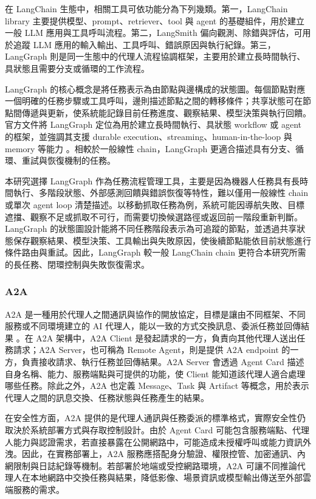 \documentclass[12pt,a4paper]{article}
\begin{document}
在 LangChain 生態中，相關工具可依功能分為下列幾類。第一，LangChain library 主要提供模型、prompt、retriever、tool 與 agent 的基礎組件，用於建立一般 LLM 應用與工具呼叫流程。第二，LangSmith 偏向觀測、除錯與評估，可用於追蹤 LLM 應用的輸入輸出、工具呼叫、錯誤原因與執行紀錄。第三，LangGraph 則是同一生態中的代理人流程協調框架，主要用於建立長時間執行、具狀態且需要分支或循環的工作流程。

LangGraph 的核心概念是將任務表示為由節點與邊構成的狀態圖。每個節點對應一個明確的任務步驟或工具呼叫，邊則描述節點之間的轉移條件；共享狀態可在節點間傳遞與更新，使系統能記錄目前任務進度、觀察結果、模型決策與執行回饋。官方文件將 LangGraph 定位為用於建立長時間執行、具狀態 workflow 或 agent 的框架，並強調其支援 durable execution、streaming、human-in-the-loop 與 memory 等能力 \cite{langgraph_workflows}。相較於一般線性 chain，LangGraph 更適合描述具有分支、循環、重試與恢復機制的任務。

本研究選擇 LangGraph 作為任務流程管理工具，主要是因為機器人任務具有長時間執行、多階段狀態、外部感測回饋與錯誤恢復等特性，難以僅用一般線性 chain 或單次 agent loop 清楚描述。以移動抓取任務為例，系統可能因導航失敗、目標遮擋、觀察不足或抓取不可行，而需要切換候選路徑或返回前一階段重新判斷。LangGraph 的狀態圖設計能將不同任務階段表示為可追蹤的節點，並透過共享狀態保存觀察結果、模型決策、工具輸出與失敗原因，使後續節點能依目前狀態進行條件路由與重試。因此，LangGraph 較一般 LangChain chain 更符合本研究所需的長任務、閉環控制與失敗恢復需求。

\subsubsection{A2A}

A2A 是一種用於代理人之間通訊與協作的開放協定，目標是讓由不同框架、不同服務或不同環境建立的 AI 代理人，能以一致的方式交換訊息、委派任務並回傳結果 \cite{a2a_spec}。在 A2A 架構中，A2A Client 是發起請求的一方，負責向其他代理人送出任務請求；A2A Server，也可稱為 Remote Agent，則是提供 A2A endpoint 的一方，負責接收請求、執行任務並回傳結果。A2A Server 會透過 Agent Card 描述自身名稱、能力、服務端點與可提供的功能，使 Client 能知道該代理人適合處理哪些任務。除此之外，A2A 也定義 Message、Task 與 Artifact 等概念，用於表示代理人之間的訊息交換、任務狀態與任務產生的結果。

在安全性方面，A2A 提供的是代理人通訊與任務委派的標準格式，實際安全性仍取決於系統部署方式與存取控制設計。由於 Agent Card 可能包含服務端點、代理人能力與認證需求，若直接暴露在公開網路中，可能造成未授權呼叫或能力資訊外洩。因此，在實務部署上，A2A 服務應搭配身分驗證、權限控管、加密通訊、內網限制與日誌紀錄等機制。若部署於地端或受控網路環境，A2A 可讓不同推論代理人在本地網路中交換任務與結果，降低影像、場景資訊或模型輸出傳送至外部雲端服務的需求。
\end{document}

